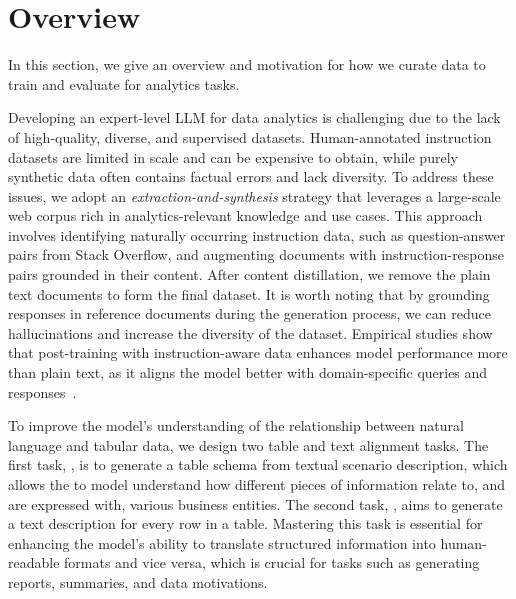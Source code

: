 \section{\modelname Overview}
In this section, we give an overview and motivation for how we curate data to train and evaluate \modelname for analytics tasks.

Developing an expert-level LLM for data analytics is challenging due to the lack of high-quality, diverse, and supervised datasets. Human-annotated instruction datasets are limited in scale and can be expensive to obtain, while purely synthetic data often contains factual errors and lack diversity. To address these issues, we adopt an \emph{extraction-and-synthesis} strategy that leverages a large-scale web corpus rich in analytics-relevant knowledge and use cases. This approach involves identifying naturally occurring instruction data, such as question-answer pairs from Stack Overflow, and augmenting documents with instruction-response pairs grounded in their content. After content distillation, we remove the plain text documents to form the final dataset. It is worth noting that by grounding responses in reference documents during the generation process, we can reduce hallucinations and increase the diversity of the dataset.  Empirical studies show that post-training with instruction-aware data enhances model performance more than plain text, as it aligns the model better with domain-specific queries and responses~\citep{chung2024scaling,instruction_pre_training}.

To improve the model's understanding of the relationship between natural language and tabular data, we design two table and text alignment tasks. The first task, \texttotable, is to generate a table schema from textual scenario description, which allows the to model understand how different pieces of information relate to, and are expressed with, various business entities. The second task, \tabletotext, aims to generate a text description for every row in a table. Mastering this task is essential for enhancing the model's ability to translate structured information into human-readable formats and vice versa, which is crucial for tasks such as generating reports, summaries, and data motivations. 


